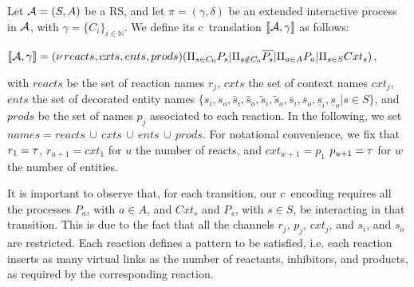 \begin{definition}[Translation]
\label{def:trans}
Let ${\cal A} = (S, A)$ be a RS, and let $\pi=(\gamma,\delta)$ be an extended interactive process in ${\cal A}$, with  $\gamma=\{C_i\}_{i\in\mathbb{N}}$. 
We define its c\CNA~translation $\llbracket{\cal A},\gamma \rrbracket$ as follows: 
\begin{center}$\llbracket{\cal A},\gamma \rrbracket = (\nu\, reacts,cxts,ents,prods)(\Pi_{s\in C_0}P_{s} | \Pi_{s \notin C_0}\overline{P_s} | \Pi_{a\in A} P_a| \Pi_{s\in S} Cxt_s)$,
\end{center} 
with  $reacts$ be the set of reaction names $r_j $, $cxts$ the set of context names $cxt_j$,  $ents$ the set of decorated entity names  $\{s_i,s_o,\hat{s}_i,\hat{s}_o,\tilde{s}_i,\tilde{s}_o,\overline{s}_i,\overline{s}_o,\underline{s}_i,\underline{s}_o| s \in S\}$, and  $prods$ be the set of names $p_j$ associated to each reaction. 
In the following, we set $names = reacts\, \cup\, cxts\, \cup\, ents\, \cup \, prods$.
For notational convenience, we fix that $r_1 = \tau$,  $r_{u+1} = cxt_1$ for $u$ the number of reacts, and $cxt_{w+1} = p_1$ $p_{u+1}=\tau$ for $w$ the number of entities.
\end{definition}
 



It is important to observe that,   for each transition, our c\CNA \ encoding requires  all the processes $P_a$, with $a \in A$, and  $Cxt_s$ and  $P_s$, with $s \in S$,  be interacting in that transition.
This is due to the fact that  all the channels $r_j$, $p_j$, $cxt_j$, and $s_{i}$, and $s_{o}$ are  restricted.
Each reaction defines a pattern to be satisfied, i.e. each reaction inserts as many virtual links  as  the number of reactants, inhibitors, and products, as required by the corresponding reaction.

